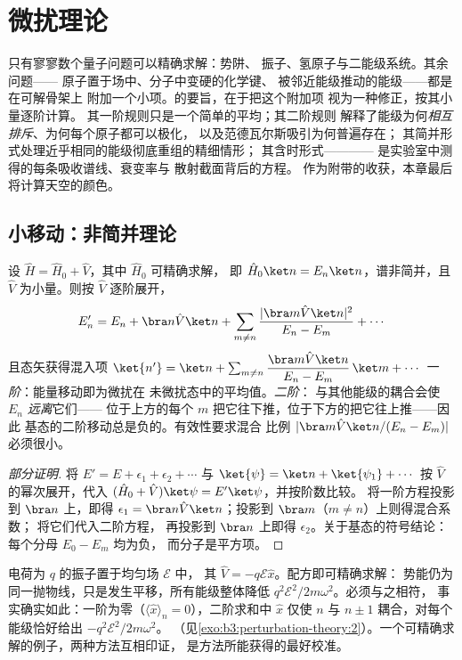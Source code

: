 \chapter{微扰理论}\label{ch:b3:perturbation-theory}

只有寥寥数个量子问题可以精确求解：势阱、
振子、氢原子与二能级系统。其余问题——
原子置于场中、分子中变硬的化学键、
被邻近能级推动的能级——都是在可解骨架上
附加一个小项。的要旨，在于把这个附加项
视为一种修正，按其小量逐阶计算。
其一阶规则只是一个简单的平均；其二阶规则
解释了能级为何\emph{相互排斥}、为何每个原子都可以极化，
以及范德瓦尔斯吸引为何普遍存在；
其简并形式处理近乎相同的能级彻底重组的精细情形；
其含时形式————
是实验室中测得的每条吸收谱线、衰变率与
散射截面背后的方程。
作为附带的收获，本章最后将计算天空的颜色。

\section{小移动：非简并理论}

\begin{theorem}[微扰修正]\label{thm:b3:perturbation-theory:corrections}
设 $\hat H = \hat H_0 + \hat V$，其中 $\hat H_0$ 可精确求解，
即 $\hat H_0\ket n = E_n\ket n$，谱非简并，且 $\hat V$
为小量。则按 $\hat V$ 逐阶展开，
\[
E_n' = E_n + \bra n\hat V\ket n
 + \sum_{m \neq n}\frac{|\bra m\hat V\ket n|^2}{E_n - E_m}
 + \cdots
\]
且态矢获得混入项 $\ket{n'} = \ket n + \sum_{m\neq
n}\dfrac{\bra m\hat V\ket n}{E_n - E_m}\,\ket m + \cdots$
\emph{一阶}：能量移动即为微扰在
未微扰态中的平均值。\emph{二阶}：
与其他能级的耦合会使 $E_n$ \emph{远离}它们——
位于上方的每个 $m$ 把它往下推，位于下方的把它往上推——因此
基态的二阶移动总是负的。有效性要求混合
比例 $|\bra m\hat V\ket n/(E_n - E_m)|$ 必须很小。
\end{theorem}

\begin{proof}[部分证明]
将 $E' = E + \epsilon_1 + \epsilon_2 + \cdots$ 与 $\ket{\psi} =
\ket n + \ket{\psi_1} + \cdots$ 按 $\hat V$ 的幂次展开，代入
$(\hat H_0 + \hat V)\ket\psi = E'\ket\psi$，并按阶数比较。
将一阶方程投影到 $\bra n$ 上，即得 $\epsilon_1 =
\bra n\hat V\ket n$；投影到 $\bra m$（$m \neq n$）上则得混合系数；
将它们代入二阶方程，
再投影到 $\bra n$ 上即得 $\epsilon_2$。关于基态的符号结论：
每个分母 $E_0 - E_m$ 均为负，
而分子是平方项。
\end{proof}

\begin{proposition}[可精确求解的微扰]\label{prop:b3:perturbation-theory:oscillator-field}
电荷为 $q$ 的振子置于均匀场 $\mathcal E$ 中，
其 $\hat V = -q\mathcal E\hat x$。配方即可精确求解：
势能仍为同一抛物线，只是发生平移，所有能级整体降低
$q^2\mathcal E^2/2m\omega^2$。必须与之相符，
事实确实如此：一阶为零（$\langle\hat
x\rangle_n = 0$），二阶求和中 $\hat x$
仅使 $n$ 与 $n \pm 1$ 耦合，对每个能级恰好给出
$-q^2\mathcal E^2/2m\omega^2$。
（见\cref{exo:b3:perturbation-theory:2}）。一个可精确求解的例子，两种方法互相印证，
是方法所能获得的最好校准。
\end{proposition}

